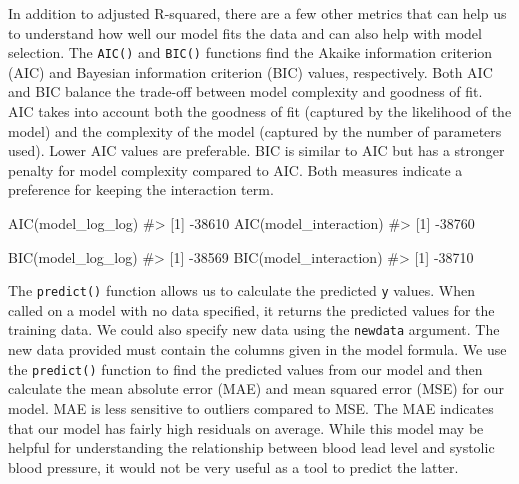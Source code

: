 \documentclass[
  letterpaper,
]{latex/krantz}
\makeatletter
\newenvironment{Shaded}{\begin{snugshade}}{\end{snugshade}}
\newcommand{\CommentTok}[1]{\textcolor[rgb]{0.37,0.37,0.37}{#1}}
\newcommand{\FunctionTok}[1]{\textcolor[rgb]{0.28,0.35,0.67}{#1}}
\newcommand{\NormalTok}[1]{\textcolor[rgb]{0.00,0.23,0.31}{#1}}
\newenvironment{kframe}{%
\medskip{}
\setlength{\fboxsep}{.8em}
 \def\at@end@of@kframe{}%
 \ifinner\ifhmode%
  \def\at@end@of@kframe{\end{minipage}}%
  \begin{minipage}{\columnwidth}%
 \fi\fi%
 \def\FrameCommand##1{\hskip\@totalleftmargin \hskip-\fboxsep
 \colorbox{shadecolor}{##1}\hskip-\fboxsep
     \hskip-\linewidth \hskip-\@totalleftmargin \hskip\columnwidth}%
 \MakeFramed {\advance\hsize-\width
   \@totalleftmargin\z@ \linewidth\hsize
   \@setminipage}}%
 {\par\unskip\endMakeFramed%
 \at@end@of@kframe}
\renewenvironment{Shaded}{\begin{kframe}}{\end{kframe}}
\makeatother
\begin{document}
In addition to adjusted R-squared, there are a few other metrics that
can help us to understand how well our model fits the data and can also
help with model selection. The
\texttt{AIC()} and
\texttt{BIC()} functions find
the Akaike information criterion (AIC) and Bayesian information
criterion (BIC) values, respectively. Both AIC and BIC balance the
trade-off between model complexity and goodness of fit. AIC takes into
account both the goodness of fit (captured by the likelihood of the
model) and the complexity of the model (captured by the number of
parameters used). Lower AIC values are preferable. BIC is similar to AIC
but has a stronger penalty for model complexity compared to AIC. Both
measures indicate a preference for keeping the interaction term.

\begin{Shaded}
\begin{Highlighting}[]
\FunctionTok{AIC}\NormalTok{(model\_log\_log)}
\CommentTok{\#\textgreater{} [1] {-}38610}
\FunctionTok{AIC}\NormalTok{(model\_interaction)}
\CommentTok{\#\textgreater{} [1] {-}38760}
\end{Highlighting}
\end{Shaded}

\begin{Shaded}
\begin{Highlighting}[]
\FunctionTok{BIC}\NormalTok{(model\_log\_log)}
\CommentTok{\#\textgreater{} [1] {-}38569}
\FunctionTok{BIC}\NormalTok{(model\_interaction)}
\CommentTok{\#\textgreater{} [1] {-}38710}
\end{Highlighting}
\end{Shaded}

The \texttt{predict()} function allows us to calculate the predicted
\texttt{y} values. When called on a model with no data specified, it
returns the predicted values for the training data. We could also
specify new data using the \texttt{newdata} argument. The new data
provided must contain the columns given in the model formula. We use the
\texttt{predict()} function to find the predicted values from our model
and then calculate the mean absolute error (MAE) and mean squared error
(MSE) for our model. MAE is less sensitive to outliers compared to MSE.
The MAE indicates that our model has fairly high residuals on average.
While this model may be helpful for understanding the relationship
between blood lead level and systolic blood pressure, it would not be
very useful as a tool to predict the latter.
\end{document}
